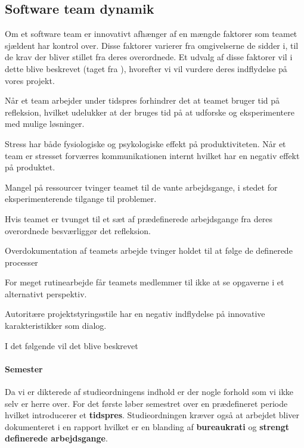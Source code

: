 \subsection{Software team dynamik}
Om et software team er innovativt afhænger af en mængde faktorer som teamet sjældent har kontrol over.
Disse faktorer varierer fra omgivelserne de sidder i, til de krav der bliver stillet fra deres overordnede.
Et udvalg af disse faktorer vil i dette blive beskrevet (taget fra \citet[s.~81-82]{book:softwareinnovation}), hvorefter vi vil vurdere deres indflydelse på vores projekt.

\begin{description}[style=nextline]
	\item[Tidspres] Når et team arbejder under tidspres forhindrer det at teamet bruger tid på refleksion, hvilket udelukker at der bruges tid på at udforske og eksperimentere med mulige løsninger.
	\item[Stress] Stress har både fysiologiske og psykologiske effekt på produktiviteten. Når et team er stresset forværres kommunikationen internt hvilket har en negativ effekt på produktet.
	\item[Ressource mangel] Mangel på ressourcer tvinger teamet til de vante arbejdsgange, i stedet for eksperimenterende tilgange til problemer.
	\item[Strengt definerede arbejdsgange] Hvis teamet er tvunget til et sæt af prædefinerede arbejdsgange fra deres overordnede besværliggør det refleksion.
	\item[Bureaukrati] Overdokumentation af teamets arbejde tvinger holdet til at følge de definerede processer 
	\item[Rutinearbejde] For meget rutinearbejde får teamets medlemmer til ikke at se opgaverne i et alternativt perspektiv.
	\item[Dårlig projektstyring] Autoritære projektstyringsstile har en negativ indflydelse på innovative karakteristikker som dialog.
\end{description}

I det følgende vil det blive beskrevet 

\paragraph{Semester}
Da vi er dikterede af studieordningens indhold er der nogle forhold som vi ikke selv er herre over.
For det første løber semestret over en prædefineret periode hvilket introducerer et \textbf{tidspres}.
Studieordningen kræver også at arbejdet bliver dokumenteret i en rapport hvilket er en blanding af \textbf{bureaukrati} og \textbf{strengt definerede arbejdsgange}.

